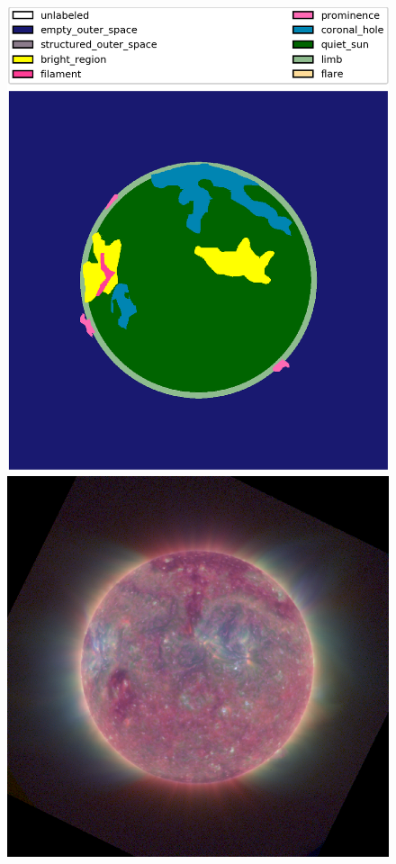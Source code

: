 \documentclass[twoside]{report}
\begin{document}
\begin{figure}[ht]
  \begin{center}
    \includegraphics[scale=0.1]{g20171015000202-0}
    \includegraphics[scale=0.35]{g20171015000202}

\end{center}
\end{figure}
\end{document}
